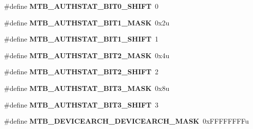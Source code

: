 \begin{DoxyCompactItemize}
\item 
\hypertarget{group___m_t_b___register___masks_ga0713a5495d348d4a4babb6bd55ad4827}{}\#define {\bfseries M\+T\+B\+\_\+\+A\+U\+T\+H\+S\+T\+A\+T\+\_\+\+B\+I\+T0\+\_\+\+S\+H\+I\+F\+T}~0\label{group___m_t_b___register___masks_ga0713a5495d348d4a4babb6bd55ad4827}

\item 
\hypertarget{group___m_t_b___register___masks_gaa036b217bc7db012d81f65d0c830d61e}{}\#define {\bfseries M\+T\+B\+\_\+\+A\+U\+T\+H\+S\+T\+A\+T\+\_\+\+B\+I\+T1\+\_\+\+M\+A\+S\+K}~0x2u\label{group___m_t_b___register___masks_gaa036b217bc7db012d81f65d0c830d61e}

\item 
\hypertarget{group___m_t_b___register___masks_ga6be2635a6e4593e4321ed7be280cb1b9}{}\#define {\bfseries M\+T\+B\+\_\+\+A\+U\+T\+H\+S\+T\+A\+T\+\_\+\+B\+I\+T1\+\_\+\+S\+H\+I\+F\+T}~1\label{group___m_t_b___register___masks_ga6be2635a6e4593e4321ed7be280cb1b9}

\item 
\hypertarget{group___m_t_b___register___masks_ga3821a5eaa059a41c5dd9d851ae1e5462}{}\#define {\bfseries M\+T\+B\+\_\+\+A\+U\+T\+H\+S\+T\+A\+T\+\_\+\+B\+I\+T2\+\_\+\+M\+A\+S\+K}~0x4u\label{group___m_t_b___register___masks_ga3821a5eaa059a41c5dd9d851ae1e5462}

\item 
\hypertarget{group___m_t_b___register___masks_gac75ef6d5ed3246bd912387fc3e43c2f5}{}\#define {\bfseries M\+T\+B\+\_\+\+A\+U\+T\+H\+S\+T\+A\+T\+\_\+\+B\+I\+T2\+\_\+\+S\+H\+I\+F\+T}~2\label{group___m_t_b___register___masks_gac75ef6d5ed3246bd912387fc3e43c2f5}

\item 
\hypertarget{group___m_t_b___register___masks_ga6e8d3b959fd40d42d3d5dc2fdec1803a}{}\#define {\bfseries M\+T\+B\+\_\+\+A\+U\+T\+H\+S\+T\+A\+T\+\_\+\+B\+I\+T3\+\_\+\+M\+A\+S\+K}~0x8u\label{group___m_t_b___register___masks_ga6e8d3b959fd40d42d3d5dc2fdec1803a}

\item 
\hypertarget{group___m_t_b___register___masks_ga2d6c6d68c2f6c8236140a26bf49bb20b}{}\#define {\bfseries M\+T\+B\+\_\+\+A\+U\+T\+H\+S\+T\+A\+T\+\_\+\+B\+I\+T3\+\_\+\+S\+H\+I\+F\+T}~3\label{group___m_t_b___register___masks_ga2d6c6d68c2f6c8236140a26bf49bb20b}

\item 
\hypertarget{group___m_t_b___register___masks_gaeae6cf618fbfa18ac171477644ef4eb6}{}\#define {\bfseries M\+T\+B\+\_\+\+D\+E\+V\+I\+C\+E\+A\+R\+C\+H\+\_\+\+D\+E\+V\+I\+C\+E\+A\+R\+C\+H\+\_\+\+M\+A\+S\+K}~0x\+F\+F\+F\+F\+F\+F\+F\+Fu\label{group___m_t_b___register___masks_gaeae6cf618fbfa18ac171477644ef4eb6}


\end{DoxyCompactItemize}
